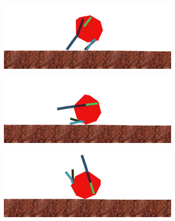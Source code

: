         \begin{figure}[H]
          \centering
          \begin{subfigure}[b]{0.45\textwidth}
            \includegraphics[width=\linewidth,center]{graphics/simulation-results/4_gen200_1}
            \caption{\label{fig:gen200_1}}
          \end{subfigure}
          \begin{subfigure}[b]{0.45\textwidth}
            \includegraphics[width=\linewidth,center]{graphics/simulation-results/4_gen200_2}
            \caption{\label{fig:gen200_2}}
          \end{subfigure}
          \begin{subfigure}[b]{0.45\textwidth}
            \includegraphics[width=\linewidth,center]{graphics/simulation-results/4_gen200_3}
            \caption{\label{fig:gen200_3}}
          \end{subfigure}
          \begin{subfigure}[b]{0.45\textwidth}

\end{subfigure}
\end{figure}
